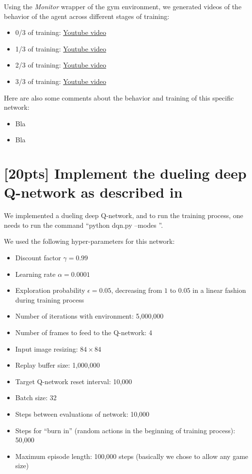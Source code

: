 \documentclass{article}
\begin{document}

Using the \textit{Monitor} wrapper of the gym environment, we generated videos of the behavior of the agent across different stages of training:

\begin{itemize}
  \item 0/3 of training: \href{http://www.sharelatex.com}{Youtube video}
  \item 1/3 of training: \href{http://www.sharelatex.com}{Youtube video}
  \item 2/3 of training: \href{http://www.sharelatex.com}{Youtube video}
  \item 3/3 of training: \href{http://www.sharelatex.com}{Youtube video}
\end{itemize}

Here are also some comments about the behavior and training of this specific network:

\begin{itemize}
  \item Bla
  \item Bla
\end{itemize}

\section{[20pts] Implement the dueling deep Q-network as described in \cite{wang2015dueling}}

We implemented a dueling deep Q-network, and to run the training process, one needs to run the command ``python dqn.py --modes ''.

We used the following hyper-parameters for this network:
\begin{itemize}
  \item Discount factor $\gamma=0.99$
  \item Learning rate $\alpha=0.0001$
  \item Exploration probability $\epsilon=0.05$, decreasing from $1$ to $0.05$ in a linear fashion during training process
  \item Number of iterations with environment: 5,000,000
  \item Number of frames to feed to the Q-network: 4
  \item Input image resizing: $84\times84$
  \item Replay buffer size: 1,000,000
  \item Target Q-network reset interval: 10,000
  \item Batch size: 32
  \item Steps between evaluations of network: 10,000
  \item Steps for ``burn in'' (random actions in the beginning of training process): 50,000
  \item Maximum episode length: 100,000 steps (basically we chose to allow any game size)
\end{itemize}
\end{document}
